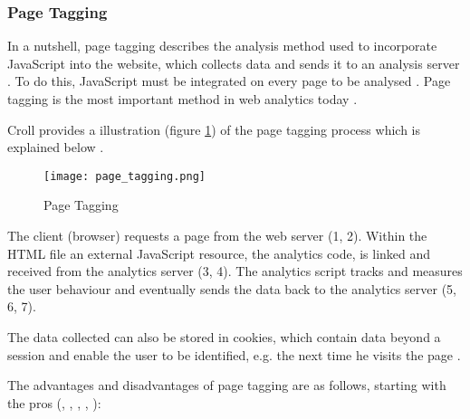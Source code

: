 \subsubsection{Page Tagging}
\label{chapter:page_tagging}

In a nutshell, page tagging describes the analysis method used to incorporate JavaScript into the website, which collects data and sends it to an analysis server \cite{2011Marek}.
To do this, JavaScript must be integrated on every page to be analysed \cite{2009Waisberg}.
Page tagging is the most important method in web analytics today \cite{2015Zheng}.


Croll provides a illustration (figure \ref{img:page_tagging}) of the page tagging process which is explained below \cite{2009Croll}.

\begin{figure}[h!]
\begin{center}
\texttt{[image: page\_tagging.png]}
\caption{Page Tagging}
\label{img:page_tagging}
\end{center}
\end{figure}

The client (browser) requests a page from the web server (1, 2).
Within the HTML file an external JavaScript resource, the analytics code, is linked and received from the analytics server (3, 4).
The analytics script tracks and measures the user behaviour and eventually sends the data back to the analytics server (5, 6, 7).

The data collected can also be stored in cookies, which contain data beyond a session and enable the user to be identified, e.g. the next time he visits the page \cite{2019Kumar}.


The advantages and disadvantages of page tagging are as follows, starting with the pros (\cite{2009Waisberg}, \cite{2011Nakatani}, \cite{2011Marek}, \cite{2014Singal}, \cite{2015Zheng}):


